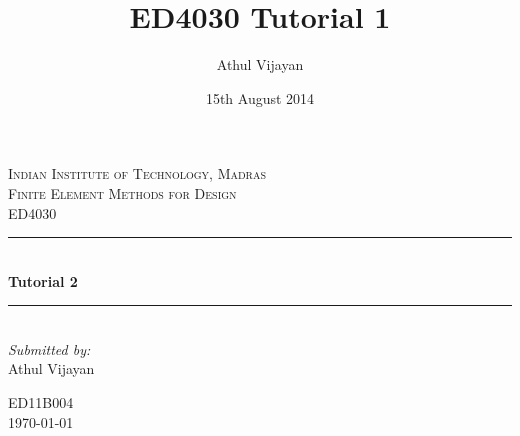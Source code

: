 \documentclass{article}
\title{ED4030 Tutorial 1}
\author{Athul Vijayan}
\date{15th August 2014}
\newcommand{\HRule}{\rule{\linewidth}{0.2mm}} %
\begin{document}
\begin{titlepage}
    \center %
     

    \textsc{\LARGE Indian Institute of Technology, Madras}\\[1.5cm] %
    \textsc{\Large Finite Element Methods for Design}\\[0.5cm] %
    \textsc{\large ED4030}\\[0.5cm] %


    \HRule \\[0.4cm]
    { \huge \bfseries Tutorial 2}\\[0.4cm] %
    \HRule \\[1.5cm]
     

    \Large \emph{Submitted by:}\\
    Athul Vijayan %

    ED11B004\\[8cm] %
    {\large \today}\\[6cm] %
    \vfill %
\end{titlepage}
\end{document}
